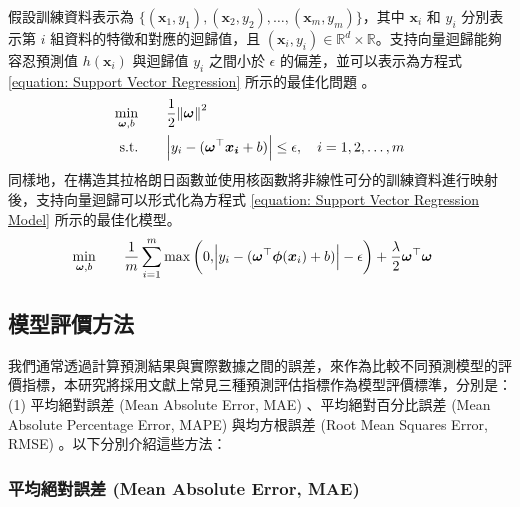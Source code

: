 假設訓練資料表示為 $\{ (\boldsymbol{x}_1, y_1), (\boldsymbol{x}_2, y_2), \ldots, (\boldsymbol{x}_{m}, y_m) \}$，其中 $\boldsymbol{x}_i$ 和 $y_i$ 分別表示第 $i$ 組資料的特徵和對應的迴歸值，且 $(\boldsymbol{x}_{i}, y_i ) \in \mathbb{R}^d \times \mathbb{R}$。支持向量迴歸能夠容忍預測值 $h(\boldsymbol{x}_i)$ 與迴歸值 $y_i$ 之間小於 $\epsilon$ 的偏差，並可以表示為方程式 \eqref{equation: Support Vector Regression} 所示的最佳化問題 \cite{drucker1997support}。
%
\begin{equation}\label{equation: Support Vector Regression}
  \begin{aligned}
    \min_{\boldsymbol{\omega}, b}   \qquad & \frac{1}{2} \norm{\boldsymbol{\omega}}^2                                                               \\
    \text{s.t.}                     \qquad & \abs{y_i - (\boldsymbol{\omega}^{\top} \boldsymbol{x_i} + b)} \leq \epsilon ,\quad i = 1, 2, \ldots, m
  \end{aligned}
\end{equation}
%
同樣地，在構造其拉格朗日函數並使用核函數將非線性可分的訓練資料進行映射後，支持向量迴歸可以形式化為方程式 \eqref{equation: Support Vector Regression Model} 所示的最佳化模型。
%
\begin{equation}\label{equation: Support Vector Regression Model}
  \begin{aligned}
    \min_{\boldsymbol{\omega}, b}   \qquad & \frac{1}{m} \sum_{i = 1}^{m} \max{\left(0, \abs{y_i - (\boldsymbol{\omega}^{\top} \boldsymbol{\phi}(\boldsymbol{x}_i) + b)} - \epsilon \right)} + \frac{\lambda}{2} \boldsymbol{\omega}^{\top}\boldsymbol{\omega}
  \end{aligned}
\end{equation}

\subsection{模型評價方法}

我們通常透過計算預測結果與實際數據之間的誤差，來作為比較不同預測模型的評價指標，本研究將採用文獻上常見三種預測評估指標作為模型評價標準，分別是：(1) 平均絕對誤差 (Mean Absolute Error, MAE) 、平均絕對百分比誤差 (Mean Absolute Percentage Error, MAPE) 與均方根誤差 (Root Mean Squares Error, RMSE) 。以下分別介紹這些方法：

\subsubsection{平均絕對誤差 (Mean Absolute Error, MAE)}

